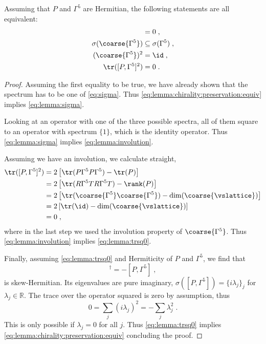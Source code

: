 \begin{lemma} \label{lemma:chirality:preservation:equiv}
Assuming that $P$ and $\Gamma^{5}$ are Hermitian, the following statements are all equivalent:
\begin{align}
[P, \Gamma^{5}] &= 0 \;, \label{eq:lemma:chirality:preservation:equiv} \\
\sigma(\coarse{\Gamma^{5}}) &\subseteq \sigma(\Gamma^{5}) \;, \label{eq:lemma:sigma} \\
(\coarse{\Gamma^{5}})^{2} &= \id \;, \label{eq:lemma:involution} \\
\tr([P, \Gamma^{5}]^{2}) &= 0 \label{eq:lemma:trsq0} \;.
\end{align}
\end{lemma}
\begin{proof}
Assuming the first equality to be true, we have already shown that the spectrum has to be one of \cref{eq:sigma}.
Thus \cref{eq:lemma:chirality:preservation:equiv} implies \cref{eq:lemma:sigma}.

Looking at an operator with one of the three possible spectra, all of them square to an operator with spectrum $\{1\}$, which is the identity operator.
Thus \cref{eq:lemma:sigma} implies \cref{eq:lemma:involution}.

Assuming we have an involution, we calculate straight,
\begin{align}
\tr([P, \Gamma^{5}]^{2})
&= 2 \left[ \tr(P \Gamma^{5} P \Gamma^{5})  - \tr(P) \right] \\
&= 2 \left[ \tr(R \Gamma^{5} T R \Gamma^{5} T)  - \rank(P) \right] \\
&= 2 \left[ \tr( \coarse{\Gamma^{5}} \coarse{\Gamma^{5}} )  - \dim(\coarse{\vslattice}) \right] \\
&= 2 \left[ \tr( \id )  - \dim(\coarse{\vslattice}) \right] \\
&= 0 \;,
\end{align}
where in the last step we used the involution property of $\coarse{\Gamma^{5}}$.
Thus \cref{eq:lemma:involution} implies \cref{eq:lemma:trsq0}.

Finally, assuming \cref{eq:lemma:trsq0} and Hermiticity of $P$ and $\Gamma^{5}$, we find that
\begin{equation}
[P, \Gamma^{5}]^{\dagger} = - [P, \Gamma^{5}] \;,
\end{equation}
is skew-Hermitian.
Its eigenvalues are pure imaginary, $\sigma([P, \Gamma^{5}]) = \{ i \lambda_j\}_j$ for $\lambda_j \in \mathbb{R}$.
The trace over the operator squared is zero by assumption, thus
\begin{equation}
0 = \sum_{j} (i \lambda_j)^2 = - \sum_{j} \lambda_j^2 \;.
\end{equation}
This is only possible if $\lambda_j=0$ for all $j$.
Thus \cref{eq:lemma:trsq0} implies \cref{eq:lemma:chirality:preservation:equiv} concluding the proof.
\end{proof}


